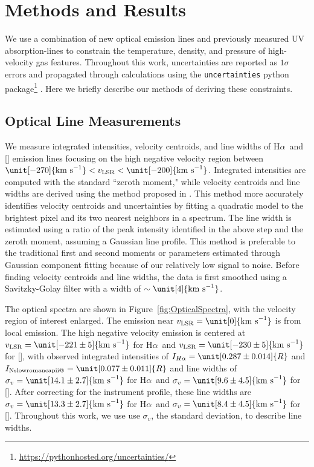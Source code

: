 \documentclass[twocolumn]{aastex63}
\makeatletter
\newcommand{\nii}{\ion{N}{2}}
\newcommand{\ha}{H\ensuremath{\alpha}}
\newcommand{\kms}{\mathrm{km~s}\ensuremath{^{-1}}}
\newcommand{\vlsr}{\ensuremath{v_\mathrm{LSR}}}
\newcommand*{\rom}[1]{\expandafter\@slowromancap\romannumeral #1@}
\makeatother
\begin{document}
\section{Methods and Results} \label{sec:methods}

We use a combination of new optical emission lines and previously measured UV absorption-lines to constrain the temperature, density, and pressure of high-velocity gas features. Throughout this work, uncertainties are reported as $1\sigma$ errors and propagated through calculations using the \texttt{uncertainties} python package\footnote{\href{https://pythonhosted.org/uncertainties/}{https://pythonhosted.org/uncertainties/}} \citep[see also][]{Ku1966}. Here we briefly describe our methods of deriving these constraints.  

\subsection{Optical Line Measurements}\label{sec:methods:optical}
We measure integrated intensities, velocity centroids, and line widths of \ha\ and [\nii] emission lines focusing on the high negative velocity region between $\unit[-270]{\kms} < \vlsr < \unit[-200]{\kms}$. Integrated intensities are computed with the standard ``zeroth moment," while velocity centroids and line widths are derived using the method proposed in \citet{Teague2018}. This method more accurately identifies velocity centroids and uncertainties by fitting a quadratic model to the brightest pixel and its two nearest neighbors in a spectrum. The line width is estimated using a ratio of the peak intensity identified in the above step and the zeroth moment, assuming a Gaussian line profile. This method is preferable to the traditional first and second moments or parameters estimated through Gaussian component fitting because of our relatively low signal to noise. Before finding velocity centroids and line widths, the data is first smoothed using a Savitzky-Golay filter \citep{Savitzky1964} with a width of $\sim \unit[4]{\kms}$. 

The optical spectra are shown in Figure~\ref{fig:OpticalSpectra}, with the velocity region of interest enlarged. The emission near $\vlsr = \unit[0]{\kms}$ is from local emission.
The high negative velocity emission is centered at $\vlsr = \unit[-221 \pm 5]{\kms}$ for \ha\ and $\vlsr = \unit[-230\pm5]{\kms}$ for [\nii], with observed integrated intensities of $I_{\ha} = \unit[0.287 \pm 0.014]{R}$ and $I_{\textrm{N\rom{2}}} = \unit[0.077 \pm 0.011]{R}$ and line widths of $\sigma_v = \unit[14.1\pm2.7]{\kms}$ for \ha\ and $\sigma_v = \unit[9.6\pm4.5]{\kms}$ for [\nii]. 
After correcting for the instrument profile, these line widths are $\sigma_v = \unit[13.3\pm2.7]{\kms}$ for \ha\ and $\sigma_v = \unit[8.4\pm4.5]{\kms}$ for [\nii].
Throughout this work, we use use $\sigma_v$, the standard deviation, to describe line widths.
\end{document}
